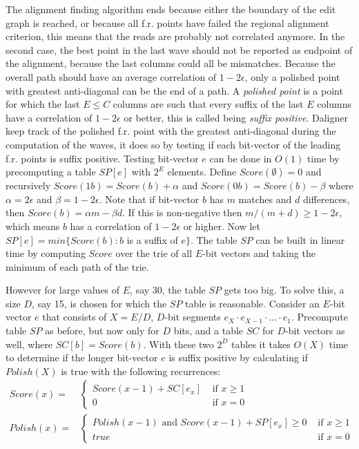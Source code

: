 \documentclass[../main/thesis.tex]{subfiles}
\begin{document}

The alignment finding algorithm ends because either the boundary of the edit graph is reached, or because all f.r. points have failed the regional alignment criterion, this means that the reads are probably not correlated anymore.
In the second case, the best point in the last wave should not be reported as endpoint of the alignment, because the last columns could all be mismatches.
Because the overall path should have an average correlation of $1-2\epsilon$, only a polished point with greatest anti-diagonal can be the end of a path.
A \textit{polished point} is a point for which the last $E\le C$ columns are such that every suffix of the last $E$ columns have a correlation of $1-2\epsilon$ or better, this is called being \textit{suffix positive}.
Daligner keep track of the polished f.r. point with the greatest anti-diagonal during the computation of the waves, it does so by testing if each bit-vector of the leading f.r. points is suffix positive.
Testing bit-vector $e$ can be done in $O(1)$ time by precomputing a table $SP[e]$ with $2^E$ elements.
Define $Score(\emptyset)=0$ and recursively $Score(1b) = Score(b) + \alpha$ and $Score(0b) = Score(b) - \beta$ where $\alpha = 2\epsilon$ and $\beta = 1-2\epsilon$.
Note that if bit-vector $b$ has $m$ matches and $d$ differences, then $Score(b) = \alpha m - \beta d$.
If this is non-negative then $m/(m+d) \ge 1-2\epsilon$, which means $b$ has a correlation of $1-2\epsilon$ or higher.
Now let $SP[e] = min\{Score(b): b$ is a suffix of $e\}$.
The table $SP$ can be built in linear time by computing $Score$ over the trie \cite{trie1}\cite{trie2} of all $E$-bit vectors and taking the minimum of each path of the trie.

However for large values of $E$, say 30, the table $SP$ gets too big.
To solve this, a size $D$, say 15, is chosen for which the $SP$ table is reasonable.
Consider an $E$-bit vector $e$ that consists of $X=E/D$, $D$-bit segments $e_X\cdot e_{X-1}\cdot ... \cdot e_1$.
Precompute table $SP$ as before, but now only for $D$ bits, and a table $SC$ for $D$-bit vectors as well, where $SC[b] = Score(b)$.
With these two $2^D$ tables it takes $O(X)$ time to determine if the longer bit-vector $e$ is suffix positive by calculating if $Polish(X)$ is true with the following recurrences:
\begin{align}
Score(x) = &\begin{cases}
Score(x-1) + SC[e_x] &\text{ if } x \ge 1 \\
0&\text{ if } x = 0
\end{cases} \\
Polish(x) = &\begin{cases}
Polish(x-1) \text{ and } Score(x-1) + SP[e_x] \ge 0 &\text{ if } x \ge 1 \\
true &\text{ if } x = 0
\end{cases}
\end{align}

\end{document}
